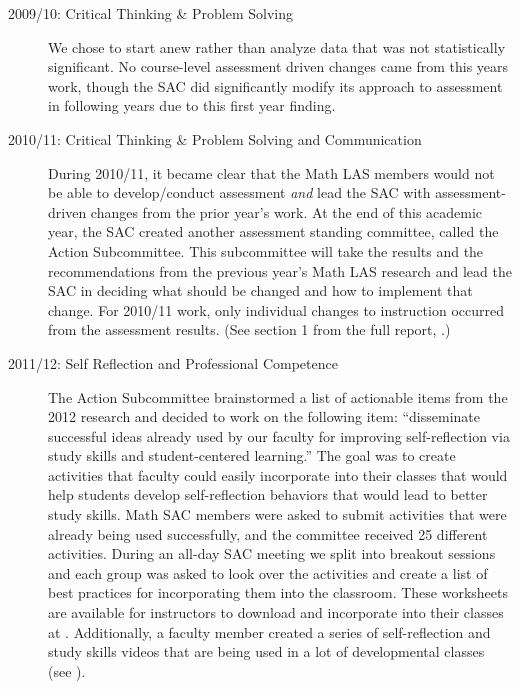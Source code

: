 \begin{description}
\item[2009/10: Critical Thinking \& Problem Solving]

We chose to start anew rather than analyze data that was not statistically
significant.  No course-level assessment driven changes came from this years
work, though the SAC did significantly modify its approach to assessment in
following years due to this first year finding.

\item[2010/11:  Critical Thinking \& Problem Solving and Communication]

During 2010/11, it became clear that the Math LAS members would not be able to
develop/conduct assessment \emph{and} lead the SAC with assessment-driven
changes from the prior year's work.  At the end of this academic year, the SAC
created another assessment standing committee, called the Action Subcommittee.
This subcommittee will take the results and the recommendations from the
previous year's Math LAS research and lead the SAC in deciding what should be
changed and how to implement that change.  For 2010/11 work, only individual
changes to instruction occurred from the assessment results.  (See section 1
from the full report, \cite{annualLASreport2010}.) 

\item[2011/12: Self Reflection and Professional Competence]

The Action Subcommittee brainstormed a list of actionable items from the 2012
research and decided to work on the following item: ``disseminate successful ideas
already used by our faculty for improving self-reflection via study skills and
student-centered learning.''  The goal was to create activities that faculty
could easily incorporate into their classes that would help students develop
self-reflection behaviors that would lead to better study skills.  Math SAC
members were asked to submit activities that were already being used
successfully, and the committee received 25 different activities.  During an
all-day SAC meeting we split into breakout sessions and each group was asked to
look over the activities and create a list of best practices for incorporating
them into the classroom. These worksheets are available for instructors to
download and incorporate into their classes at \cite{selfcenteredlearning}.
Additionally, a faculty member created a series of self-reflection and study
skills videos that are being used in a lot of developmental classes (see
).


\end{description}
